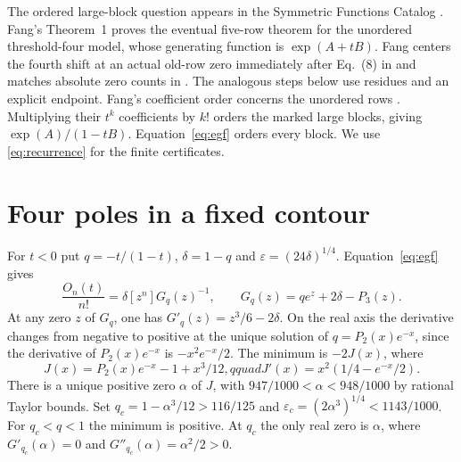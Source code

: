 \documentclass[11pt]{article}
\newcommand{\e}{\varepsilon}
\begin{document}
The ordered large-block question appears in the Symmetric Functions
Catalog \cite{catalog}. Fang's Theorem~1 \cite{fang} proves the
eventual five-row theorem for the unordered threshold-four model,
whose generating function is $\exp(A+tB)$. Fang centers the fourth
shift at an actual old-row zero immediately after Eq.~(8) in
\cite[\S5.1]{fang} and matches absolute zero counts in \cite[\S6]{fang}.
The analogous steps below use residues and an explicit endpoint.
Fang's coefficient order concerns the unordered rows
\cite[\S8]{fang}. Multiplying their $t^k$ coefficients by $k!$
orders the marked large blocks, giving $\exp(A)/(1-tB)$.
Equation~\eqref{eq:egf} orders every block. We use
\eqref{eq:recurrence} for the finite certificates.

\section{Four poles in a fixed contour}
For $t<0$ put $q=-t/(1-t)$, $\delta=1-q$ and $\e=(24\delta)^{1/4}$.
Equation~\eqref{eq:egf} gives
\begin{equation}\label{eq:G}
 \frac{O_n(t)}{n!}=\delta[z^n]G_q(z)^{-1},\qquad
 G_q(z)=q e^z+2\delta-P_3(z).
\end{equation}
At any zero $z$ of $G_q$, one has $G'_q(z)=z^3/6-2\delta$.
On the real axis the derivative changes from negative to positive
at the unique solution of $q=P_2(x)e^{-x}$, since the derivative
of $P_2(x)e^{-x}$ is $-x^2 e^{-x}/2$. The minimum is $-2J(x)$,
where
\[
 J(x)=P_2(x)e^{-x}-1+x^3/12,qquad
 J'(x)=x^2(1/4-e^{-x}/2).
\]
There is a unique positive zero $\alpha$ of $J$, with
$947/1000<\alpha<948/1000$ by rational Taylor bounds.
Set $q_c=1-\alpha^3/12>116/125$ and
$\e_c=(2\alpha^3)^{1/4}<1143/1000$. For $q_c<q<1$ the minimum is
positive. At $q_c$ the only real zero is $\alpha$, where
$G'_{q_c}(\alpha)=0$ and $G''_{q_c}(\alpha)=\alpha^2/2>0$.
\end{document}

